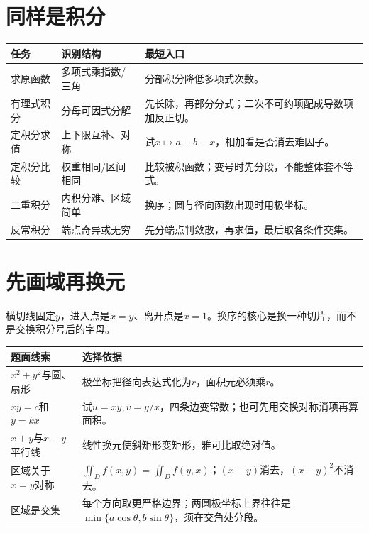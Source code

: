 \section{同样是积分}
\begin{tabularx}{\textwidth}{p{27mm}Y Y}
\toprule 任务&识别结构&最短入口\\\midrule
求原函数&多项式乘指数/三角&分部积分降低多项式次数。\\
有理式积分&分母可因式分解&先长除，再部分分式；二次不可约项配成导数项加反正切。\\
定积分求值&上下限互补、对称&试$x\mapsto a+b-x$，相加看是否消去难因子。\\
定积分比较&权重相同/区间相同&比较被积函数；变号时先分段，不能整体套不等式。\\
二重积分&内积分难、区域简单&换序；圆与径向函数出现时用极坐标。\\
反常积分&端点奇异或无穷&先分端点判敛散，再求值，最后取各条件交集。\\\bottomrule
\end{tabularx}

\section{先画域再换元}
\begin{center}
\end{center}
横切线固定$y$，进入点是$x=y$、离开点是$x=1$。换序的核心是换一种切片，而不是交换积分号后的字母。
\begin{tabularx}{\textwidth}{p{35mm}Y}
\toprule 题面线索&选择依据\\\midrule
$x^2+y^2$与圆、扇形&极坐标把径向表达式化为$r$，面积元必须乘$r$。\\
$xy=c$和$y=kx$&试$u=xy,v=y/x$，四条边变常数；也可先用交换对称消项再算面积。\\
$x+y$与$x-y$平行线&线性换元使斜矩形变矩形，雅可比取绝对值。\\
区域关于$x=y$对称&$\iint_Df(x,y)=\iint_Df(y,x)$；$(x-y)$消去，$(x-y)^2$不消去。\\
区域是交集&每个方向取更严格边界；两圆极坐标上界往往是$\min\{a\cos\theta,b\sin\theta\}$，须在交角处分段。\\\bottomrule
\end{tabularx}


